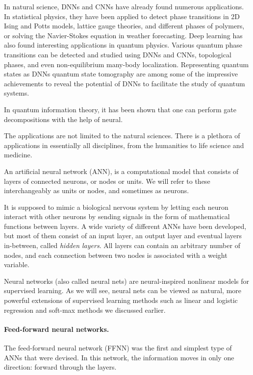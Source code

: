 \noindent
In natural science, DNNs and CNNs have already found numerous
applications. In statistical physics, they have been applied to detect
phase transitions in 2D Ising and Potts models, lattice gauge
theories, and different phases of polymers, or solving the
Navier-Stokes equation in weather forecasting.  Deep learning has also
found interesting applications in quantum physics. Various quantum
phase transitions can be detected and studied using DNNs and CNNs,
topological phases, and even non-equilibrium many-body
localization. Representing quantum states as DNNs quantum state
tomography are among some of the impressive achievements to reveal the
potential of DNNs to facilitate the study of quantum systems.

In quantum information theory, it has been shown that one can perform
gate decompositions with the help of neural. 

The applications are not limited to the natural sciences. There is a
plethora of applications in essentially all disciplines, from the
humanities to life science and medicine.

An artificial neural network (ANN), is a computational model that
consists of layers of connected neurons, or nodes or units.  We will
refer to these interchangeably as units or nodes, and sometimes as
neurons.

It is supposed to mimic a biological nervous system by letting each
neuron interact with other neurons by sending signals in the form of
mathematical functions between layers.  A wide variety of different
ANNs have been developed, but most of them consist of an input layer,
an output layer and eventual layers in-between, called \emph{hidden
layers}. All layers can contain an arbitrary number of nodes, and each
connection between two nodes is associated with a weight variable.

Neural networks (also called neural nets) are neural-inspired
nonlinear models for supervised learning.  As we will see, neural nets
can be viewed as natural, more powerful extensions of supervised
learning methods such as linear and logistic regression and soft-max
methods we discussed earlier.

\paragraph{Feed-forward neural networks.}
The feed-forward neural network (FFNN) was the first and simplest type
of ANNs that were devised. In this network, the information moves in
only one direction: forward through the layers.

